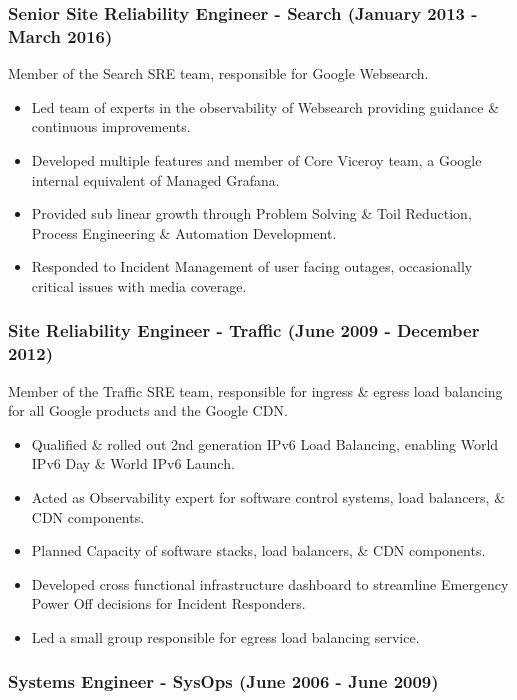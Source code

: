 \documentclass[a4paper, 10pt] {article}
\begin{document}
\subsubsection*{Senior Site Reliability Engineer - Search (January 2013 - March 2016)}

Member of the Search SRE team, responsible for Google Websearch.

\begin{itemize}[noitemsep]
	\item Led team of experts in the observability of Websearch providing guidance \& continuous improvements.
	\item Developed multiple features and member of Core Viceroy team, a Google internal equivalent of Managed Grafana.
	\item Provided sub linear growth through Problem Solving \& Toil Reduction, Process Engineering \& Automation Development.
	\item Responded to Incident Management of user facing outages, occasionally critical issues with media coverage.
\end{itemize}

\subsubsection*{Site Reliability Engineer - Traffic (June 2009 - December 2012)}

Member of the Traffic SRE team, responsible for ingress \& egress load
balancing for all Google products and the Google CDN. 

\begin{itemize}[noitemsep]
  \item Qualified \& rolled out 2nd generation IPv6 Load Balancing, enabling World IPv6 Day \& World IPv6 Launch.
	\item Acted as Observability expert for software control systems, load balancers, \& CDN components.
	\item Planned Capacity of software stacks, load balancers, \& CDN components.
	\item Developed cross functional infrastructure dashboard to streamline Emergency Power Off decisions for Incident Responders.
	\item Led a small group responsible for egress load balancing service.
\end{itemize}

\subsubsection*{Systems Engineer - SysOps (June 2006 - June 2009)}
\end{document}
